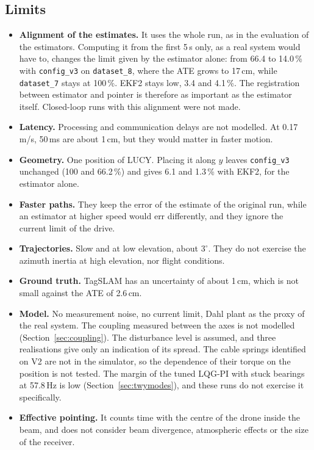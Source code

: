 \subsection{Limits}\label{sec:tp_limits}
\begin{itemize}
\item \textbf{Alignment of the estimates.} It uses the whole run, as in the evaluation of the estimators. Computing it from the first 5\,s only, as a real system would have to, changes the limit given by the estimator alone: from 66.4 to 14.0\,\% with \texttt{config\_v3} on \texttt{dataset\_8}, where the ATE grows to 17\,cm, while \texttt{dataset\_7} stays at 100\,\%. EKF2 stays low, 3.4 and 4.1\,\%. The registration between estimator and pointer is therefore as important as the estimator itself. Closed-loop runs with this alignment were not made.
\item \textbf{Latency.} Processing and communication delays are not modelled. At 0.17\,m/s, 50\,ms are about 1\,cm, but they would matter in faster motion.
\item \textbf{Geometry.} One position of LUCY. Placing it along $y$ leaves \texttt{config\_v3} unchanged (100 and 66.2\,\%) and gives 6.1 and 1.3\,\% with EKF2, for the estimator alone.
\item \textbf{Faster paths.} They keep the error of the estimate of the original run, while an estimator at higher speed would err differently, and they ignore the current limit of the drive.
\item \textbf{Trajectories.} Slow and at low elevation, about $3^\circ$. They do not exercise the azimuth inertia at high elevation, nor flight conditions.
\item \textbf{Ground truth.} TagSLAM has an uncertainty of about 1\,cm, which is not small against the ATE of 2.6\,cm.
\item \textbf{Model.} No measurement noise, no current limit, Dahl plant as the proxy of the real system. The coupling measured between the axes is not modelled (Section~\ref{sec:coupling}). The disturbance level is assumed, and three realisations give only an indication of its spread. The cable springs identified on V2 are not in the simulator, so the dependence of their torque on the position is not tested. The margin of the tuned LQG-PI with stuck bearings at 57.8\,Hz is low (Section~\ref{sec:twymodes}), and these runs do not exercise it specifically.
\item \textbf{Effective pointing.} It counts time with the centre of the drone inside the beam, and does not consider beam divergence, atmospheric effects or the size of the receiver.
\end{itemize}

